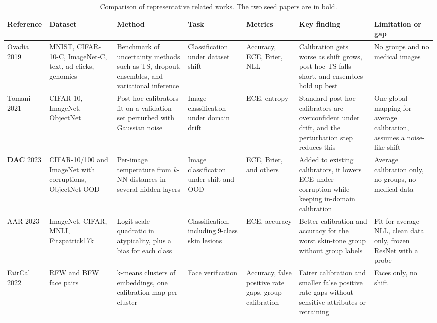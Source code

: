 \documentclass[sigconf,nonacm]{acmart}
\begin{document}
\begin{table}[t]
  \caption{Comparison of representative related works. The two seed papers are in bold.}
  \label{tab:literature}
  \scriptsize
  \setlength{\tabcolsep}{3pt}
  \renewcommand{\arraystretch}{1.1}
  \begin{tabularx}{\textwidth}{@{}P{1.75cm}P{2.3cm}LP{1.9cm}P{1.85cm}LP{2.55cm}@{}}
    \toprule
    \textbf{Reference} & \textbf{Dataset} & \textbf{Method} & \textbf{Task} & \textbf{Metrics} & \textbf{Key finding} & \textbf{Limitation or gap} \\
    \midrule
    Ovadia 2019 \cite{ovadia2019trust} & MNIST, CIFAR-10-C, ImageNet-C, text, ad clicks, genomics & Benchmark of uncertainty methods such as TS, dropout, ensembles, and variational inference & Classification under dataset shift & Accuracy, ECE, Brier, NLL & Calibration gets worse as shift grows, post-hoc TS falls short, and ensembles hold up best & No groups and no medical images \\
    \addlinespace
    Tomani 2021 \cite{tomani2021posthoc} & CIFAR-10, ImageNet, ObjectNet & Post-hoc calibrators fit on a validation set perturbed with Gaussian noise & Image classification under domain drift & ECE, entropy & Standard post-hoc calibrators are overconfident under drift, and the perturbation step reduces this & One global mapping for average calibration, assumes a noise-like shift \\
    \addlinespace
    \textbf{DAC} 2023 \cite{tomani2023dac} & CIFAR-10/100 and ImageNet with corruptions, ObjectNet-OOD & Per-image temperature from $k$-NN distances in several hidden layers & Image classification under shift and OOD & ECE, Brier, and others & Added to existing calibrators, it lowers ECE under corruption while keeping in-domain calibration & Average calibration only, no groups, no medical data \\
    \addlinespace
    AAR 2023 \cite{yuksekgonul2023atypicality} & ImageNet, CIFAR, MNLI, Fitzpatrick17k & Logit scale quadratic in atypicality, plus a bias for each class & Classification, including 9-class skin lesions & ECE, accuracy & Better calibration and accuracy for the worst skin-tone group without group labels & Fit for average NLL, clean data only, frozen ResNet with a probe \\
    \addlinespace
    FairCal 2022 \cite{salvador2022faircal} & RFW and BFW face pairs & k-means clusters of embeddings, one calibration map per cluster & Face verification & Accuracy, false positive rate gaps, group calibration & Fairer calibration and smaller false positive rate gaps without sensitive attributes or retraining & Faces only, no shift \\

\end{tabularx}
\end{table}
\end{document}
